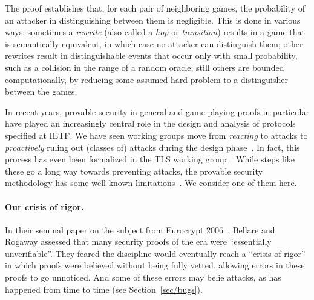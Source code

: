\documentclass{article}
\begin{document}
The proof establishes that, for each pair of neighboring games, the probability
of an attacker in distinguishing between them is negligible.
%
This is done in various ways:
%
sometimes a \emph{rewrite} (also called a \emph{hop} or \emph{transition})
results in a game that is semantically equivalent, in which case no attacker
can distinguish them;
%
other rewrites result in distinguishable events that occur only with small
probability, such as a collision in the range of a random oracle;
%
still others are bounded computationally, by reducing some assumed hard problem
to a distinguisher between the games.

In recent years, provable security in general and game-playing proofs in
particular have played an increasingly central role in the design and analysis
of protocols specified at IETF. We have seen working groups move from
\emph{reacting} to attacks to \emph{proactively} ruling out (classes of)
attacks during the design phase~\cite{KT16}.
%
In fact, this process has even been formalized in the TLS working
group~\cite{tls13-formal-analysis-triage-panel}.
%
While steps like these go a long way towards preventing attacks, the provable
security methodology has some well-known limitations~\cite{Ber19}.
%
We consider one of them here.

\paragraph{Our crisis of rigor.}
%
In their seminal paper on the subject from Eurocrypt 2006~\cite{BR06}, Bellare
and Rogaway assessed that many security proofs of the era were ``essentially
unverifiable''. They feared the discipline would eventually reach a ``crisis of
rigor'' in which proofs were believed without being fully vetted, allowing
errors in these proofs to go unnoticed. And some of these errors may belie
attacks, as has happened from time to time (see Section~\ref{sec/bugs}).
%
\end{document}
